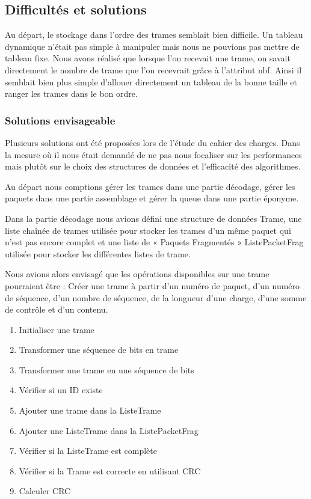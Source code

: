 \documentclass[a4paper,11pt]{article}
\begin{document}
\subsection{Difficultés et solutions}

Au départ, le stockage dans l'ordre des trames semblait bien difficile. Un tableau dynamique n'était pas simple à manipuler mais nous ne pouvions pas mettre de tableau fixe. Nous avons réalisé que lorsque l'on recevait une trame, on savait directement le nombre de trame que l'on recevrait grâce à l’attribut nbf. Ainsi il semblait bien plus simple d'allouer directement un tableau de la bonne taille et ranger les trames dans le bon ordre.

\subsubsection{Solutions envisageable}

Plusieurs solutions ont été proposées lors de l'étude du cahier des charges. Dans la mesure où il nous était demandé de ne pas nous focaliser sur les performances mais plutôt sur le choix des structures de données et l'efficacité des algorithmes.

Au départ nous comptions gérer les trames dans une partie décodage, gérer les paquets dans une partie assemblage et gérer la queue dans une partie éponyme.
 
Dans la partie décodage nous avions défini une structure de données Trame, une liste chaînée de trames utilisée pour stocker les trames d'un même paquet qui n'est pas encore complet et une liste de « Paquets Fragmentés » ListePacketFrag utilisée pour stocker les différentes listes de trame.


Nous avions alors envisagé que les opérations disponibles sur une trame pourraient être :
Créer une trame à partir d'un numéro de paquet, d'un numéro de séquence, d'un nombre de séquence, de la longueur d'une charge, d'une somme de contrôle et d'un contenu.
\begin{enumerate}
 \item Initialiser une trame
 \item Transformer une séquence de bits en trame
 \item Transformer une trame en une séquence de bits
 \item Vérifier si un ID existe
 \item Ajouter une trame dans la ListeTrame
 \item Ajouter une ListeTrame dans la ListePacketFrag
 \item Vérifier si la ListeTrame est complète
 \item Vérifier si la Trame est correcte en utilisant CRC
 \item Calculer CRC
\end{enumerate}
\end{document}
